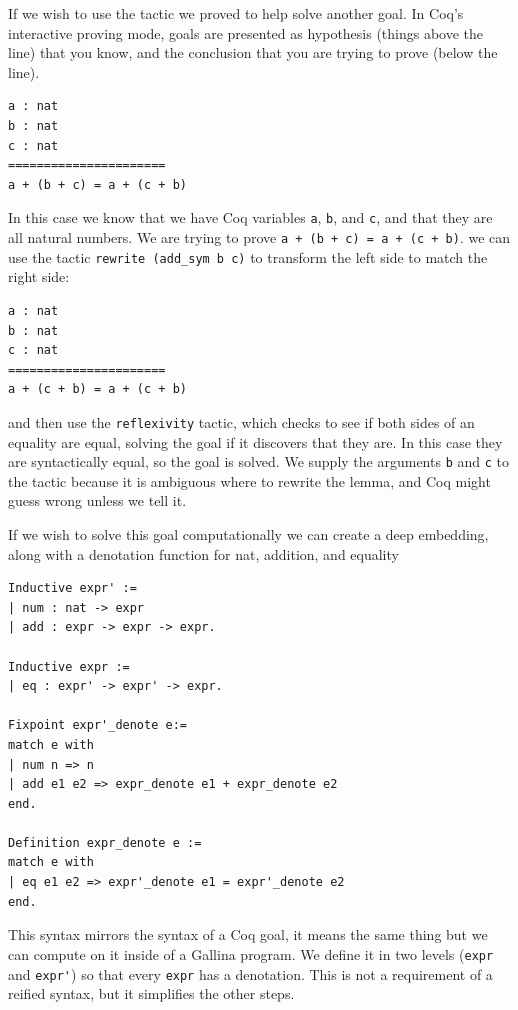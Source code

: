 \documentclass{puthesis}
\begin{document}
If we wish to use the tactic we proved to help solve another goal. In
Coq's interactive proving mode, goals are presented as hypothesis
(things above the line) that you know, and the conclusion that you are
trying to prove (below the line). 

\begin{lstlisting}
a : nat
b : nat
c : nat
======================
a + (b + c) = a + (c + b) 
\end{lstlisting}

In this case we know that we have Coq variables \lstinline|a|,
\lstinline|b|, and \lstinline|c|, and that they are all natural
numbers. We are trying to prove \lstinline|a + (b + c) = a + (c + b)|.
we can use the tactic \lstinline|rewrite (add_sym b c)|
to transform the left side to match the right side:

\begin{lstlisting}
a : nat
b : nat
c : nat
======================
a + (c + b) = a + (c + b) 
\end{lstlisting}

\noindent and then use the \lstinline|reflexivity| tactic, which
checks to see if both sides of an equality are equal, solving the goal
if it discovers that they are. In this case they are syntactically
equal, so the goal is solved. We supply the arguments \lstinline|b|
and \lstinline|c| to the tactic because it is ambiguous where to
rewrite the lemma, and Coq might guess wrong unless we tell it.

If we wish to solve this goal computationally we can create a deep
embedding, along with a denotation function for nat, addition, and
equality

\begin{lstlisting}
Inductive expr' :=
| num : nat -> expr
| add : expr -> expr -> expr.

Inductive expr :=
| eq : expr' -> expr' -> expr.

Fixpoint expr'_denote e:=
match e with
| num n => n
| add e1 e2 => expr_denote e1 + expr_denote e2
end.

Definition expr_denote e :=
match e with
| eq e1 e2 => expr'_denote e1 = expr'_denote e2
end.
\end{lstlisting} 

This syntax mirrors the syntax of a Coq goal, it means the same thing
but we can compute on it inside of a Gallina program. We define it in
two levels (\lstinline|expr| and \lstinline|expr'|) so that every
\lstinline|expr| has a denotation. This is not a requirement of a
reified syntax, but it simplifies the other steps.
\end{document}
